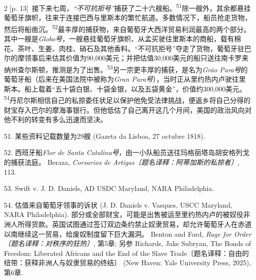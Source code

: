 \documentclass[10pt,a4paper]{article}
\begin{document}
\begin{paracol}{2}
{\scriptsize\color{gray} [p. 13]}\ 接下来七周，\textit{“不可抗拒号”}捕获了二十六艘\mbox{船。\textsuperscript{51}}除一艘外，其余都悬挂葡萄牙旗帜，往来于连接巴西与里斯本的繁忙航道。多数情况下，船员抢走货物，然后将船凿\mbox{沉。\textsuperscript{52}}最丰厚的捕获物，来自葡萄牙大西洋贸易利润最高的两个部分。其中一艘是\textit{Globo号}，一艘悬挂葡萄牙旗帜、从孟买驶往里斯本的商船，载有棉花、茶叶、生姜、肉桂、硝石及其他香料。“不可抗拒号”夺走了货物，葡萄牙驻巴尔的摩领事后来估其价值为90,000美元；并把估值30,000美元的船只送往南卡罗来纳州查尔斯顿，推测是为了出\mbox{售。\textsuperscript{53}}另一宗更丰厚的捕获，是名为\textit{Grão Para号}的葡萄牙船（后来在美国法院中被称为\textit{Gran Para号}），当时正从里约热内卢驶往里斯本。船上载着“五十袋白银、十袋金银，以及五袋黄金”，价值约300,000美\mbox{元。\textsuperscript{54}}丹尼尔斯相信自己的私掠委任状足以保护他免受法律挑战，便返乡将自己分得的财宝存入巴尔的摩海事银行。但他低估了自己离开这几个月间，美国的政治风向对他不利的转变有多么迅速而坚决。\par{\small 51. 某些资料记载数量为29艘 (Gazeta da Lisboa, 27 octubre 1818).\par}{\small 52. 西班牙船\textit{Flor de Santa Catalina号}，由一小队船员送往玛格丽塔岛胡安格列戈的捕获法庭。 Beraza, \textit{Corsarios de Artigas〔题名译释：阿蒂加斯的私掠者〕}, 113.\par}{\small 53. Swift v. J. D. Daniels, AD USDC Maryland, NARA Philadelphia.\par}{\small 54. 估值来自葡萄牙领事的诉状 (J. D. Daniels v. Vasques, USCC Maryland, NARA Philadelphia). 部分或全部财宝，可能是出售被运至里约热内卢的被奴役非洲人所得货款。英国试图通过签订双边条约禁止奴隶贸易，却允许葡萄牙人在赤道以南继续这一贸易，给废奴制度留下巨大漏洞。 Benton and Ford, \textit{Rage for Order〔题名译释：对秩序的狂热〕}, 第5章; 另参 Richards, Jake Subryan, The Bonds of Freedom: Liberated Africans and the End of the Slave Trade〔题名译释：自由的纽带：获释非洲人与奴隶贸易的终结〕 (New Haven: Yale University Press, 2025), 第6章.\par}
\switchcolumn

\end{paracol}
\end{document}
